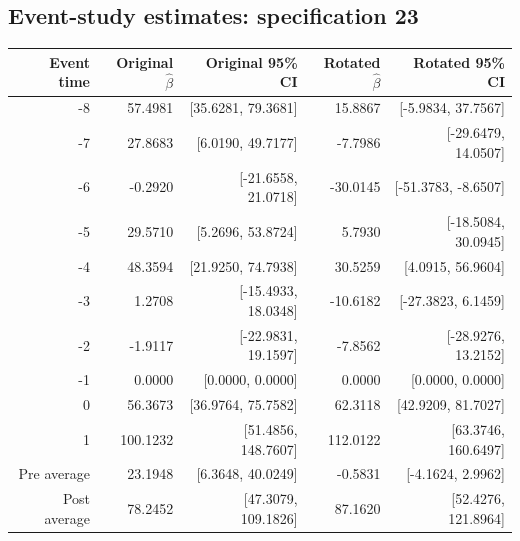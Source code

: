 \documentclass[10pt]{article}
\begin{document}
\subsection*{Event-study estimates: specification 23}
\begin{center}\scriptsize
\begin{tabular}{r rr rr}
\toprule
Event time & Original $\hat\beta$ & Original 95\% CI & Rotated $\hat\beta$ & Rotated 95\% CI \\
\midrule
-8 & 57.4981 & [35.6281, 79.3681] & 15.8867 & [-5.9834, 37.7567] \\
-7 & 27.8683 & [6.0190, 49.7177] & -7.7986 & [-29.6479, 14.0507] \\
-6 & -0.2920 & [-21.6558, 21.0718] & -30.0145 & [-51.3783, -8.6507] \\
-5 & 29.5710 & [5.2696, 53.8724] & 5.7930 & [-18.5084, 30.0945] \\
-4 & 48.3594 & [21.9250, 74.7938] & 30.5259 & [4.0915, 56.9604] \\
-3 & 1.2708 & [-15.4933, 18.0348] & -10.6182 & [-27.3823, 6.1459] \\
-2 & -1.9117 & [-22.9831, 19.1597] & -7.8562 & [-28.9276, 13.2152] \\
-1 & 0.0000 & [0.0000, 0.0000] & 0.0000 & [0.0000, 0.0000] \\
0 & 56.3673 & [36.9764, 75.7582] & 62.3118 & [42.9209, 81.7027] \\
1 & 100.1232 & [51.4856, 148.7607] & 112.0122 & [63.3746, 160.6497] \\
\midrule
Pre average & 23.1948 & [6.3648, 40.0249] & -0.5831 & [-4.1624, 2.9962] \\
Post average & 78.2452 & [47.3079, 109.1826] & 87.1620 & [52.4276, 121.8964] \\
\bottomrule
\end{tabular}
\end{center}
\clearpage
\end{document}
